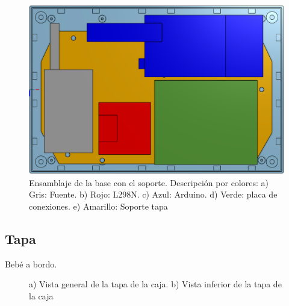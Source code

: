 \begin{figure}[hbtp]
    \centering
    \includegraphics[width=\textwidth/2]{04-caja/ensamblajebase.png}
    \caption{Ensamblaje de la base con el soporte. Descripción por colores: a) Gris: Fuente. 
    b) Rojo: L298N. c) Azul: Arduino. d) Verde: placa de conexiones. e) Amarillo: Soporte tapa}
    \label{fig:ensamblajebase}
    \end{figure}


\subsection{Tapa}
Bebé a bordo.

\begin{figure}[htpb]%
    \centering 
    \hspace{10pt}%
    \caption{a) Vista general de la tapa de la caja. b) Vista inferior de la tapa de la caja}
    \label{fig:cajatapa} 
\end{figure} 
